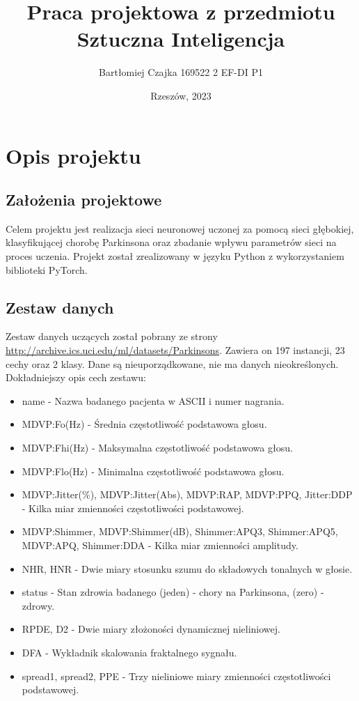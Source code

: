 \documentclass{article}
\title{\textbf{Praca projektowa z przedmiotu Sztuczna Inteligencja}}
\author{Bartłomiej Czajka 169522 2 EF-DI P1}
\date{Rzeszów, 2023}
\begin{document}
\maketitle
\pagebreak


\tableofcontents{}
\newpage
\section{Opis projektu}
\subsection{Założenia projektowe}
Celem projektu jest realizacja sieci neuronowej uczonej za pomocą sieci głębokiej, klasyfikującej chorobę Parkinsona oraz zbadanie wpływu parametrów sieci na proces uczenia.
Projekt został zrealizowany w języku Python z wykorzystaniem biblioteki PyTorch.
\subsection{Zestaw danych}
Zestaw danych uczących został pobrany ze strony \href{http://archive.ics.uci.edu/ml/datasets/Parkinsons}{http://archive.ics.uci.edu/ml/datasets/Parkinsons}.
Zawiera on 197 instancji, 23 cechy oraz 2 klasy. Dane są nieuporządkowane, nie ma danych nieokreślonych.
Dokładniejszy opis cech zestawu:
\begin{itemize}
    \item name - Nazwa badanego pacjenta w ASCII i numer nagrania.
    \item MDVP:Fo(Hz) - Średnia częstotliwość podstawowa głosu.
    \item MDVP:Fhi(Hz) - Maksymalna częstotliwość podstawowa głosu.
    \item MDVP:Flo(Hz) - Minimalna częstotliwość podstawowa głosu.
    \item MDVP:Jitter(\%), MDVP:Jitter(Abs), MDVP:RAP, MDVP:PPQ, Jitter:DDP - Kilka miar zmienności częstotliwości podstawowej.
    \item MDVP:Shimmer, MDVP:Shimmer(dB), Shimmer:APQ3, Shimmer:APQ5, MDVP:APQ, Shimmer:DDA - Kilka miar zmienności amplitudy.
    \item NHR, HNR - Dwie miary stosunku szumu do składowych tonalnych w głosie.
    \item status - Stan zdrowia badanego (jeden) - chory na Parkinsona, (zero) - zdrowy.
    \item RPDE, D2 - Dwie miary złożoności dynamicznej nieliniowej.
    \item DFA - Wykładnik skalowania fraktalnego sygnału.
    \item spread1, spread2, PPE - Trzy nieliniowe miary zmienności częstotliwości podstawowej.
\end{itemize}
\end{document}
